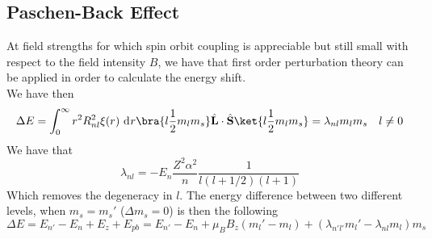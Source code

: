 \documentclass[a4paper, 11pt]{book}
\renewcommand{\vec}[1]{\mathbf{#1}}
\newcommand{\1}{\opr{\mathds{1}}}
\newcommand{\diff}[2][]{\ \mathrm{d}^{#1}#2}
\newcommand{\opr}[1]{\hat{#1}}
\newcommand{\vecopr}[1]{\opr{\vec{#1}}}
\theoremstyle{plain}
\begin{document}
	\subsection{Paschen-Back Effect}
	At field strengths for which spin orbit coupling is appreciable but still small with respect to the field intensity $B$, we have that first order perturbation theory can be applied in order to calculate the energy shift.\\
	We have then
	\begin{equation}
		\Delta E=\int_{0}^{\infty}r^2R_{nl}^2\xi(r)\diff{r}\bra{l\frac{1}{2}m_lm_s}\vecopr{L}\cdot\vecopr{S}\ket{l\frac{1}{2}m_lm_s}=\lambda_{nl}m_lm_s\quad l\ne0
		\label{eq:paschenbackshiftfirstorder}
	\end{equation}
	We have that
	\begin{equation}
		\lambda_{nl}=-E_n\frac{Z^2\alpha^2}{n}\frac{1}{l(l+1/2)(l+1)}
		\label{eq:lambdapb}
	\end{equation}
	Which removes the degeneracy in $l$. The energy difference between two different levels, when $m_s=m_s'$ ($\Delta m_s=0$) is then the following
	\begin{equation}
		\Delta E=E_{n'}-E_n+E_{z}+E_{pb}=E_{n'}-E_n+\mu_BB_z(m_l'-m_l)+(\lambda_{n'l'}m_l'-\lambda_{nl}m_l)m_s
		\label{eq:paschenbackshift}
	\end{equation}
\end{document}

